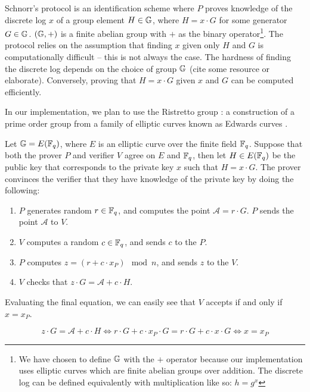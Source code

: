 Schnorr's protocol \cite{Schnorr} is an identification scheme where $P$ proves knowledge of the discrete log $x$ of a group element $H \in \mathbb{G}$, where $H = x \cdot G$ for some generator $G \in \mathbb{G}$. $(\mathbb{G}, +)$ is a finite abelian group with $+$ as the binary operator\footnote{We have chosen to define $\mathbb{G}$ with the $+$ operator because our implementation uses elliptic curves which are finite abelian groups over addition. The discrete log can be defined equivalently with multiplication like so: $h = g^x$}. The protocol relies on the assumption that finding $x$ given only $H$ and $G$ is computationally difficult -- this is not always the case. The hardness of finding the discrete log depends on the choice of group $\mathbb{G}$ (cite some resource or elaborate). Conversely, proving that $H = x \cdot G$ given $x$ and $G$ can be computed efficiently. 

In our implementation, we plan to use the Ristretto group \cite{ristretto_web}: a construction of a prime order group from a family of elliptic curves known as Edwards curves \cite{Edwards2007}. 

\begin{definition}
Let $\mathbb{G} = E(\mathbb{F}_q)$, where $E$ is an elliptic curve over the finite field $\mathbb{F}_q$. Suppose that both the prover $P$ and verifier $V$ agree on $E$ and $\mathbb{F}_q$, then let $H \in E(\mathbb{F}_q)$ be the public key that corresponds to the private key $x$ such that $H = x \cdot G$. The prover convinces the verifier that they have knowledge of the private key by doing the following:

\begin{enumerate}
    \item $P$ generates random $r \in \mathbb{F}_q$, and computes the point $\mathcal A = r \cdot G$. $P$ sends the point $\mathcal A$ to $V$.
    \item $V$ computes a random $c \in \mathbb{F}_q$, and sends $c$ to the $P$.
    \item $P$ computes $z = (r + c \cdot x_P) \mod n$, and sends $z$ to the $V$.
    \item $V$ checks that $z \cdot G = \mathcal A + c \cdot H$.
\end{enumerate} 

Evaluating the final equation, we can easily see that $V$ accepts if and only if $x = x_P$. 

\begin{equation*}
    z \cdot G = \mathcal A + c \cdot H \iff
    r \cdot G + c \cdot x_P \cdot G  = r \cdot G + c \cdot x \cdot G \iff
    x  =  x_P
\end{equation*}
\end{definition}


